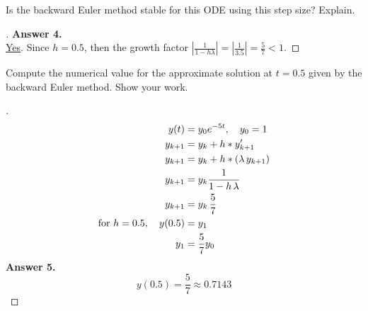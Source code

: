 \documentclass[12pt]{article}
\newenvironment{exercise}[2][Exercise]{\begin{trivlist}
\item[\hskip \labelsep {\bfseries #1}\hskip \labelsep {\bfseries #2.}]}{\end{trivlist}}
\begin{document}
\pagebreak
\begin{exercise}{4}
	Is the backward Euler method stable for this ODE using this step size? Explain.
\end{exercise} 
\begin{proof}[] \vspace{-2mm}
	\textbf{Answer 4.} \\ %
	\underline{Yes}. Since $h=0.5$, then the growth factor $|\frac{1}{1 - h \lambda} | = |\frac{1}{3.5}| = \frac{5}{7} < 1$. 
\end{proof}

\vspace{10mm}
\begin{exercise}{5}
	Compute the numerical value for the approximate solution at $t=0.5$ given by the backward Euler method. Show your work.
\end{exercise} 
\begin{proof}[] \vspace{-2mm}
	\begin{align*}
		y(t) &= y_0 e^{-5t}, \quad y_0 = 1 \\
		y_{k+1} &= y_k + h * y_{k+1}' \\
		y_{k+1} &= y_k + h * (\lambda \, y_{k+1}) \\
		y_{k+1} &= y_k \frac{1}{1 - h \, \lambda}\\
		y_{k+1} &= y_k \, \frac{5}{7}\\
		\textnormal{for } h = 0.5, \quad y(0.5) &= y_1 \\
		y_1 &= \frac{5}{7} y_0
	\end{align*}
	\textbf{Answer 5.}  \vspace{-7mm} \\
	\[ \boxed{ y(0.5) = \frac{5}{7} \approx 0.7143  } \]
\end{proof}
\end{document}
